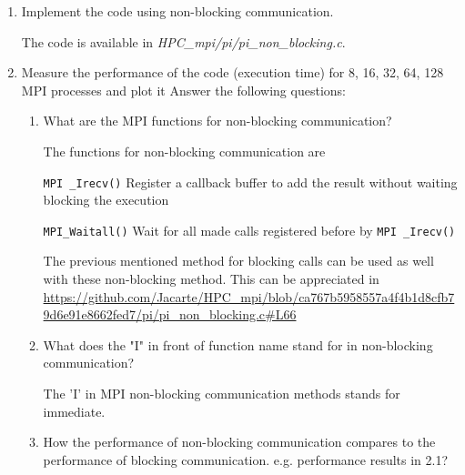 \documentclass[12pt]{article}
\begin{document}
\begin{enumerate}
	\item Implement the code using non-blocking communication.
	
	The code is available in \textit{HPC\_mpi/pi/pi\_non\_blocking.c}.
	\item  Measure the performance of the code (execution time) for 8, 16, 32,  64, 128 MPI processes and plot it
	Answer the following questions:
	\begin{enumerate}
		\item What are the MPI functions for non-blocking communication? 
		
		The functions for non-blocking communication are 
		
		\texttt{MPI
		\_Irecv()} Register a callback buffer to add the result without waiting blocking the execution


		\texttt{MPI\_Waitall()} Wait for all made calls registered before by \texttt{MPI
		\_Irecv()}

		The previous mentioned method for blocking calls can be used as well with these non-blocking method. This can be appreciated in \url{https://github.com/Jacarte/HPC_mpi/blob/ca767b5958557a4f4b1d8cfb79d6e91e8662fed7/pi/pi_non_blocking.c#L66}

		

		\item What does the "I" in front of function name stand for in non-blocking communication?
		
		The 'I' in MPI non-blocking communication methods stands for immediate.

		\item How the performance of non-blocking communication compares to the performance of blocking communication. e.g. performance results in 2.1?
  

\end{enumerate}
\end{enumerate}
\end{document}
